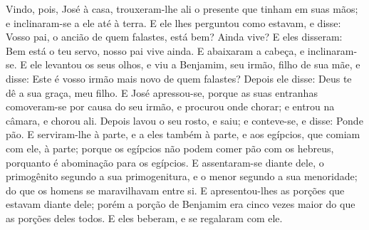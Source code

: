 Vindo, pois, José à casa, trouxeram-lhe ali o presente que tinham
em suas mãos; e inclinaram-se a ele até à terra. E ele lhes
perguntou como estavam, e disse: Vosso pai, o ancião de quem
falastes, está bem? Ainda vive? E eles disseram: Bem está o
teu servo, nosso pai vive ainda. E abaixaram a cabeça, e
inclinaram-se. E ele levantou os seus olhos, e viu a
Benjamim, seu irmão, filho de sua mãe, e disse: Este é vosso irmão
mais novo de quem falastes? Depois ele disse: Deus te dê a sua
graça, meu filho. E José apressou-se, porque as suas
entranhas comoveram-se por causa do seu irmão, e procurou onde
chorar; e entrou na câmara, e chorou ali. Depois lavou o seu
rosto, e saiu; e conteve-se, e disse: Ponde pão. E
serviram-lhe à parte, e a eles também à parte, e aos egípcios, que
comiam com ele, à parte; porque os egípcios não podem comer pão com
os hebreus, porquanto é abominação para os egípcios. E
assentaram-se diante dele, o primogênito segundo a sua
primogenitura, e o menor segundo a sua menoridade; do que os homens
se maravilhavam entre si. E apresentou-lhes as porções que
estavam diante dele; porém a porção de Benjamim era cinco vezes
maior do que as porções deles todos. E eles beberam, e se regalaram
com ele.

\smallskip

